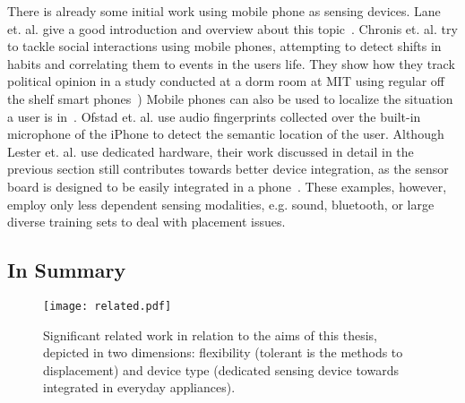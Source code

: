  
There is already some initial work using mobile phone as sensing devices.
Lane et. al. give a good introduction and overview about this topic~\cite{Lane:2010p580}. 
Chronis et. al. try to tackle social interactions using mobile phones, attempting to detect shifts
in habits and correlating them to events in the users life. They show
how they track political opinion in a study conducted at a dorm room at MIT 
using regular off the shelf smart phones~\cite{Chronis:2009p7854})
Mobile phones can also be used to localize the situation a user is in~\cite{Ofstad:2008p7556}.
Ofstad et. al. use audio fingerprints collected over the built-in microphone of the iPhone
to detect the semantic location of the user. 
Although Lester et. al. use dedicated hardware, their work discussed in detail in the previous section
 still contributes towards better device integration, as the sensor board is designed to be easily integrated 
in a phone~\cite{lester2006par}.
These examples, however, employ only less dependent sensing modalities, e.g. sound, bluetooth, or large
diverse training sets to deal with placement issues. 

\subsection{In Summary}

\begin{figure*}[t]
\centering \texttt{[image: related.pdf]}
\caption[Related work and thesis aims]{Significant related work in relation to the aims of this
 thesis, depicted in two dimensions: flexibility (tolerant is the
 methods to displacement) and device type (dedicated sensing device
 towards integrated in everyday appliances).}
\label{fig:relatedwork}
\end{figure*}


